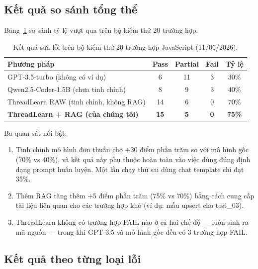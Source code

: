 \documentclass[12pt]{article}
\begin{document}
\subsection{Kết quả so sánh tổng thể}

Bảng~\ref{tab:ketqua} so sánh tỷ lệ vượt qua trên bộ kiểm thử 20 trường hợp.

\begin{table}[ht]
  \centering
  \caption{Kết quả sửa lỗi trên bộ kiểm thử 20 trường hợp JavaScript (11/06/2026).}
  \label{tab:ketqua}
  \begin{tabular}{@{}lcccc@{}}
    \toprule
    \textbf{Phương pháp} & \textbf{Pass} & \textbf{Partial} & \textbf{Fail} & \textbf{Tỷ lệ} \\
    \midrule
    GPT-3.5-turbo (không có ví dụ)                    & 6  & 11 & 3 & 30\% \\
    Qwen2.5-Coder-1.5B (chưa tinh chỉnh)              & 8  & 9  & 3 & 40\% \\
    ThreadLearn RAW (tinh chỉnh, không RAG)            & 14 & 6  & 0 & 70\% \\
    \textbf{ThreadLearn + RAG (của chúng tôi)}         & \textbf{15} & \textbf{5} & \textbf{0} & \textbf{75\%} \\
    \bottomrule
  \end{tabular}
\end{table}

Ba quan sát nổi bật:
\begin{enumerate}[leftmargin=2em]
  \item Tinh chỉnh mô hình đơn thuần cho $+$30 điểm phần trăm so với mô hình gốc
    (70\% vs 40\%), và kết quả này phụ thuộc hoàn toàn vào việc dùng đúng định dạng
    prompt huấn luyện.
    Một lần chạy thử sai dùng chat template chỉ đạt 35\%.
  \item Thêm RAG tăng thêm $+$5 điểm phần trăm (75\% vs 70\%) bằng cách cung cấp
    tài liệu liên quan cho các trường hợp khó (ví dụ: mẫu upsert cho test\_03).
  \item ThreadLearn không có trường hợp FAIL nào ở cả hai chế độ --- luôn sinh
    ra mã nguồn --- trong khi GPT-3.5 và mô hình gốc đều có 3 trường hợp FAIL.
\end{enumerate}

\subsection{Kết quả theo từng loại lỗi}
\end{document}
